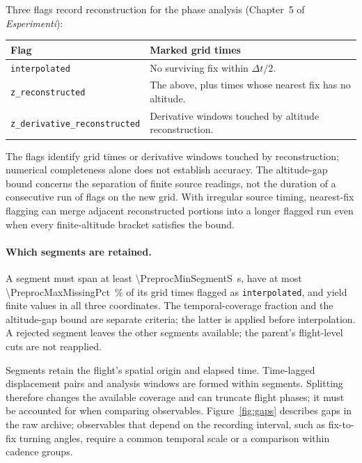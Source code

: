 Three flags record reconstruction for the phase analysis
(Chapter~5 of \emph{Esperimenti}):
\begin{center}
\begin{tabularx}{\linewidth}{@{}l X@{}}
\toprule
\textbf{Flag} & \textbf{Marked grid times} \\
\midrule
\texttt{interpolated} & No surviving fix within $\Delta t/2$. \\
\texttt{z\_reconstructed} & The above, plus times whose nearest fix has no altitude. \\
\texttt{z\_derivative\_reconstructed} & Derivative windows touched by altitude reconstruction. \\
\bottomrule
\end{tabularx}
\end{center}
The flags identify grid times or derivative windows touched by reconstruction;
numerical completeness alone does not establish accuracy. The altitude-gap
bound concerns the separation of finite source readings, not the duration of
a consecutive run of flags on the new grid. With irregular source timing,
nearest-fix flagging can merge adjacent reconstructed portions into a longer
flagged run even when every finite-altitude bracket satisfies the bound.

\paragraph{Which segments are retained.}
A segment must span at least \SI{\PreprocMinSegmentS}{\second}, have at most
\SI{\PreprocMaxMissingPct}{\percent} of its grid times flagged as
\texttt{interpolated}, and yield finite values in all three coordinates.
The temporal-coverage fraction and the altitude-gap bound are separate criteria;
the latter is applied before interpolation.
A rejected segment leaves the other segments available; the parent's flight-level
cuts are not reapplied.

Segments retain the flight's spatial origin and elapsed time. Time-lagged displacement
pairs and analysis windows are formed within segments. Splitting therefore changes the
available coverage and can truncate flight phases; it must be accounted for when
comparing observables. Figure~\ref{fig:gaps} describes gaps in the raw archive;
observables that depend on the recording interval, such as
fix-to-fix turning angles, require a common temporal scale or a comparison within
cadence groups.


